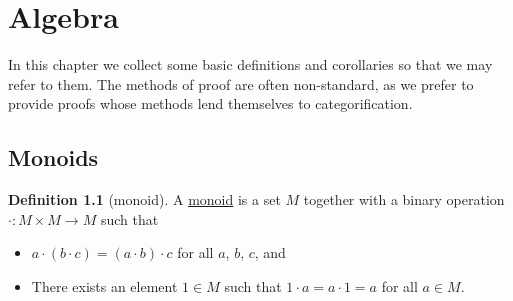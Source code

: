 \documentclass[a4paper,10pt]{scrreprt}
\newcommand{\C}{\mathbb{C}}
\newcommand{\defn}[1]{\ul{#1}}
\theoremstyle{definition}
\newtheorem{definition}{Definition}[section]
\theoremstyle{plain}
\theoremstyle{remark}
\newtheorem{note}{Note}[section]
\begin{document}
%
\appendix
\chapter{Algebra}

In this chapter we collect some basic definitions and corollaries so that we may refer to them. The methods of proof are often non-standard, as we prefer to provide proofs whose methods lend themselves to categorification.
\section{Monoids}
\begin{definition}[monoid]
  \label{def:monoid}
  A \defn{monoid} is a set $M$ together with a binary operation $\cdot\colon M \times M \to M$ such that
  \begin{itemize}
    \item $a \cdot (b \cdot c)=(a \cdot b) \cdot c$ for all $a$, $b$, $c$, and
    \item There exists an element $1 \in M$ such that $1 \cdot a=a \cdot 1=a$ for all $a \in M$.
  \end{itemize}
\end{definition}
\end{document}
